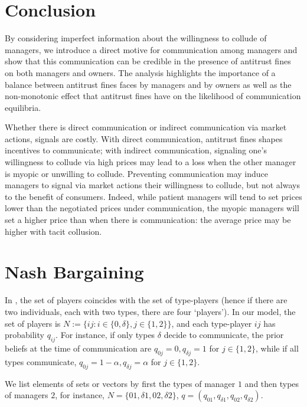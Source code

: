 \documentclass[]{article}
\begin{document}
\section{Conclusion}
By considering imperfect information about the willingness to collude of managers, we introduce a direct motive for communication among managers and show that this communication can be credible in the presence of antitrust fines on both managers and owners.  The analysis highlights the importance of a balance between antitrust fines faces by managers and by owners as well as the non-monotonic effect that antitrust fines have on the likelihood of communication equilibria. 

Whether there is direct communication or indirect communication via market actions, signals are costly. With direct communication, antitrust fines shapes incentives to communicate; with indirect communication, signaling one's willingness to collude via high prices may lead to a loss when the other manager is myopic or unwilling to collude. Preventing communication may induce managers to signal via market actions their willingness to collude, but not always to the benefit of consumers. Indeed, while patient managers will tend to set prices lower than the negotiated prices under communication, the myopic managers will set a higher price than when there is communication: the average price may be higher with tacit collusion. 
 




\appendix
\section{Nash Bargaining}\label{app:HS}
%
In \cite{Harsanyi1972}, the set of players coincides with the set of type-players (hence if there are two individuals, each with two types, there are four `players'). In our model, the set of players is $N:=\{ij:i\in\{0,\delta\},j\in\{1,2\}\}$, and each type-player $ij$ has probability $q_{ij}$.  For instance, if only types $\delta$ decide to communicate, the prior beliefs at the time of communication are $q_{0j}=0,q_{\delta j}=1$ for $j\in\{1,2\}$, while if all types communicate, $q_{0j}=1-\alpha,q_{\delta j}=\alpha$ for $j\in\{1,2\}$. 

We list elements of sets or vectors by first the types of manager $1$ and then types of managers $2$, for instance, $N=\{01,\delta 1, 02,\delta 2\}$, $q=(q_{01},q_{\delta 1},q_{02},q_{\delta 2})$.
\end{document}
